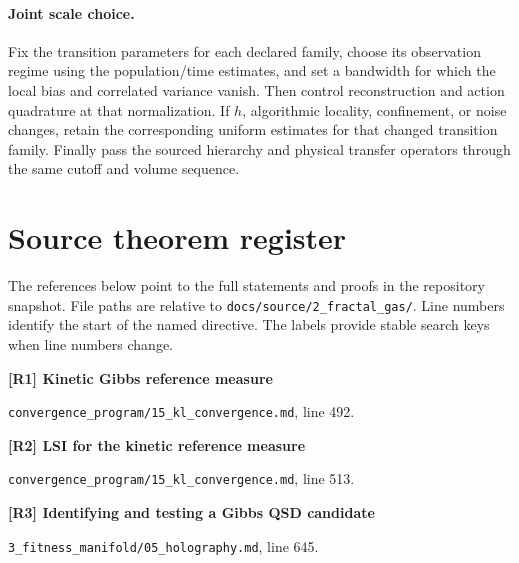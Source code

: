 \documentclass[11pt,a4paper]{article}
\begin{document}
\paragraph{Joint scale choice.}
Fix the transition parameters for each declared family, choose its observation regime using the population/time estimates, and set a bandwidth for which the local bias and correlated variance vanish. Then control reconstruction and action quadrature at that normalization. If \(h\), algorithmic locality, confinement, or noise changes, retain the corresponding uniform estimates for that changed transition family. Finally pass the sourced hierarchy and physical transfer operators through the same cutoff and volume sequence.

\clearpage
\appendix
\section{Source theorem register}
The references below point to the full statements and proofs in the repository snapshot. File paths are relative to \texttt{docs/source/2\_fractal\_gas/}. Line numbers identify the start of the named directive. The labels provide stable search keys when line numbers change.

\par\medskip\noindent\begin{minipage}{\linewidth}\textbf{[R1] Kinetic Gibbs reference measure}\label{src:def-gibbs-kinetic}\par
{\small\texttt{}\par
\nolinkurl{convergence_program/15_kl_convergence.md}, line 492.\par}
\end{minipage}\par

\par\medskip\noindent\begin{minipage}{\linewidth}\textbf{[R2] LSI for the kinetic reference measure}\label{src:thm-kinetic-lsi}\par
{\small\texttt{}\par
\nolinkurl{convergence_program/15_kl_convergence.md}, line 513.\par}
\end{minipage}\par

\par\medskip\noindent\begin{minipage}{\linewidth}\textbf{[R3] Identifying and testing a Gibbs QSD candidate}\label{src:thm-qsd-gibbs}\par
{\small\texttt{}\par
\nolinkurl{3_fitness_manifold/05_holography.md}, line 645.\par}
\end{minipage}\par
\end{document}
